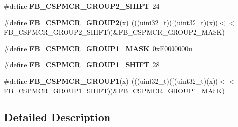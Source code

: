 \begin{DoxyCompactItemize}
\item 
\#define {\bfseries F\+B\+\_\+\+C\+S\+P\+M\+C\+R\+\_\+\+G\+R\+O\+U\+P2\+\_\+\+S\+H\+I\+FT}~24\hypertarget{group__FB__Register__Masks_ga332a2c4e7103b2f21af54da036518928}{}\label{group__FB__Register__Masks_ga332a2c4e7103b2f21af54da036518928}

\item 
\#define {\bfseries F\+B\+\_\+\+C\+S\+P\+M\+C\+R\+\_\+\+G\+R\+O\+U\+P2}(x)~(((uint32\+\_\+t)(((uint32\+\_\+t)(x))$<$$<$F\+B\+\_\+\+C\+S\+P\+M\+C\+R\+\_\+\+G\+R\+O\+U\+P2\+\_\+\+S\+H\+I\+FT))\&F\+B\+\_\+\+C\+S\+P\+M\+C\+R\+\_\+\+G\+R\+O\+U\+P2\+\_\+\+M\+A\+SK)\hypertarget{group__FB__Register__Masks_ga90ca2c9ade016544de01e8ff18906bdc}{}\label{group__FB__Register__Masks_ga90ca2c9ade016544de01e8ff18906bdc}

\item 
\#define {\bfseries F\+B\+\_\+\+C\+S\+P\+M\+C\+R\+\_\+\+G\+R\+O\+U\+P1\+\_\+\+M\+A\+SK}~0x\+F0000000u\hypertarget{group__FB__Register__Masks_ga735fd2a0040e9ad1122a3c3fc8e28193}{}\label{group__FB__Register__Masks_ga735fd2a0040e9ad1122a3c3fc8e28193}

\item 
\#define {\bfseries F\+B\+\_\+\+C\+S\+P\+M\+C\+R\+\_\+\+G\+R\+O\+U\+P1\+\_\+\+S\+H\+I\+FT}~28\hypertarget{group__FB__Register__Masks_ga9c83850dcb3efe92a0404101e5afbdca}{}\label{group__FB__Register__Masks_ga9c83850dcb3efe92a0404101e5afbdca}

\item 
\#define {\bfseries F\+B\+\_\+\+C\+S\+P\+M\+C\+R\+\_\+\+G\+R\+O\+U\+P1}(x)~(((uint32\+\_\+t)(((uint32\+\_\+t)(x))$<$$<$F\+B\+\_\+\+C\+S\+P\+M\+C\+R\+\_\+\+G\+R\+O\+U\+P1\+\_\+\+S\+H\+I\+FT))\&F\+B\+\_\+\+C\+S\+P\+M\+C\+R\+\_\+\+G\+R\+O\+U\+P1\+\_\+\+M\+A\+SK)\hypertarget{group__FB__Register__Masks_gad8cfbe8c479a928d91e215283db376af}{}\label{group__FB__Register__Masks_gad8cfbe8c479a928d91e215283db376af}

\end{DoxyCompactItemize}


\subsection{Detailed Description}
